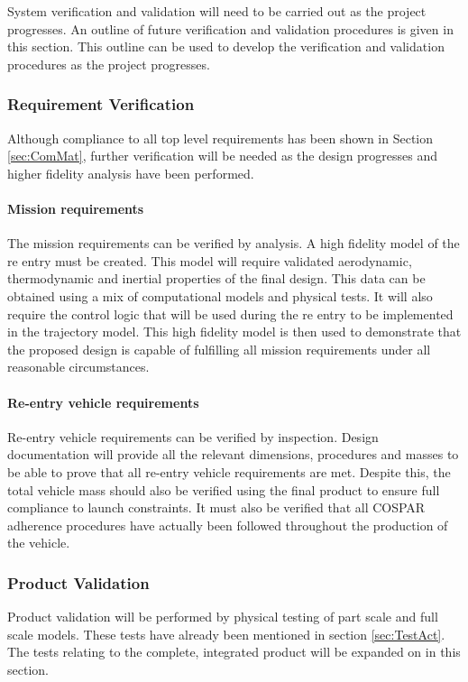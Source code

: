 System verification and validation will need to be carried out as the project progresses. An outline of future verification and validation procedures is given in this section. This outline can be used to develop the verification and validation procedures as the project progresses. 

\subsubsection{Requirement Verification}
\label{sec:ReqVer}
Although compliance to all top level requirements has been shown in Section \ref{sec:ComMat}, further verification will be needed as the design progresses and higher fidelity analysis have been performed. 

\paragraph{Mission requirements}
The mission requirements can be verified by analysis. A high fidelity model of the re entry must be created. This model will require validated aerodynamic, thermodynamic and inertial properties of the final design. This data can be obtained using a mix of computational models and physical tests. It will also require the control logic that will be used during the re entry to be implemented in the trajectory model. This high fidelity model is then used to demonstrate that the proposed design is capable of fulfilling all mission requirements under all reasonable circumstances. 

\paragraph{Re-entry vehicle requirements}
Re-entry vehicle requirements can be verified by inspection. Design documentation will provide all the relevant dimensions, procedures and masses to be able to prove that all re-entry vehicle requirements are met. Despite this, the total vehicle mass should also be verified using the final product to ensure full compliance to launch constraints. It must also be verified that all COSPAR adherence procedures have actually been followed throughout the production of the vehicle. 

\subsubsection{Product Validation}
Product validation will be performed by physical testing of part scale and full scale models. These tests have already been mentioned in section \ref{sec:TestAct}. The tests relating to the complete, integrated product will be expanded on in this section. 




